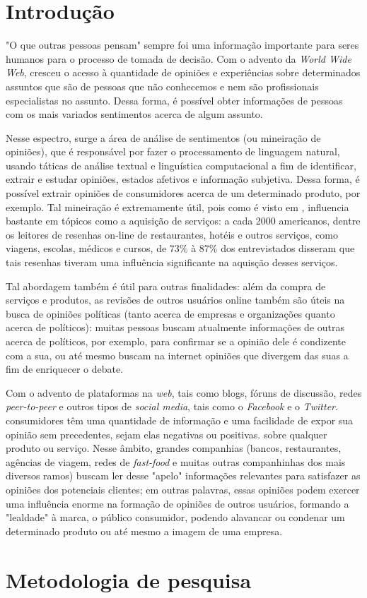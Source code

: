 \documentclass[a4paper]{article}
\begin{document}
\section{Introdução}

"O que outras pessoas pensam" sempre foi uma informação importante para seres humanos para o processo de tomada de decisão. Com o advento da \emph{World Wide Web}, cresceu o acesso à quantidade de opiniões e experiências sobre determinados assuntos que são de pessoas que não conhecemos e nem são profissionais especialistas no assunto. Dessa forma, é possível obter informações de pessoas com os mais variados sentimentos acerca de algum assunto.

Nesse espectro, surge a área de análise de sentimentos (ou mineiração de opiniões), que é responsável por fazer o processamento de linguagem natural, usando táticas de análise textual e linguística computacional a fim de identificar, extrair e estudar opiniões, estados afetivos e informação subjetiva. Dessa forma, é possível extrair opiniões de consumidores acerca de um determinado produto, por exemplo. Tal mineiração é extremamente útil, pois como é visto em  \cite{pang2008opinion}, influencia bastante em tópicos como a aquisição de serviços: a cada 2000 americanos, dentre os leitores de resenhas on-line de restaurantes, hotéis e outros serviços, como viagens, escolas, médicos e cursos, de 73\% à 87\% dos entrevistados disseram que tais resenhas tiveram uma influência significante na aquisção desses serviços.\citep{zhu2010impact}

Tal abordagem também é útil para outras finalidades: além da compra de serviços e produtos, as revisões de outros usuários online também são úteis na busca de opiniões políticas (tanto acerca de empresas e organizações quanto acerca de políticos): muitas pessoas buscam atualmente informações de outras acerca de políticos, por exemplo, para confirmar se a opinião dele é condizente com a sua, ou até mesmo buscam na internet opiniões que divergem das suas a fim de enriquecer o debate. \citep{gil2009weblogs}

Com o advento de plataformas na \emph{web}, tais como blogs, fóruns de discussão, redes \emph{peer-to-peer} e outros tipos de \emph{social media}, tais como o \emph{Facebook} e o \emph{Twitter}. consumidores têm uma quantidade de informação e uma facilidade de expor sua opinião sem precedentes, sejam elas negativas ou positivas. sobre qualquer produto ou serviço. Nesse âmbito, grandes companhias (bancos, restaurantes, agências de viagem, redes de \emph{fast-food} e muitas outras companhinhas dos mais diversos ramos) buscam ler desse "apelo" informações relevantes para satisfazer as opiniões dos potenciais clientes; em outras palavras, essas opiniões podem exercer uma influência enorme na formação de opiniões de outros usuários, formando a "lealdade" à marca, o público consumidor, podendo alavancar ou condenar um determinado produto ou até mesmo a imagem de uma empresa. \citep{hoffman2008online}

\section{Metodologia de pesquisa}




\end{document}
